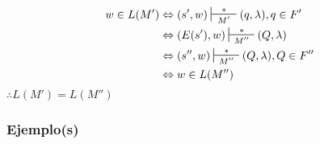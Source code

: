 \begin{align*}
w \in L(M') & \Leftrightarrow (s',w) \sststile{M'}{\hspace{0.25cm} * \hspace{0.25cm}} (q,\lambda), q\in F' \\
& \Leftrightarrow	(E(s'),w) \sststile{M''}{\hspace{0.25cm} * \hspace{0.25cm}} (Q,\lambda)\\
& \Leftrightarrow (s'',w) \sststile{M''}{\hspace{0.25cm} * \hspace{0.25cm}} (Q,\lambda), Q\in F'' \\
& \Leftrightarrow  w\in L(M'')
\end{align*}
$\therefore L(M')=L(M'')$
\subsubsection{Ejemplo(s)}
